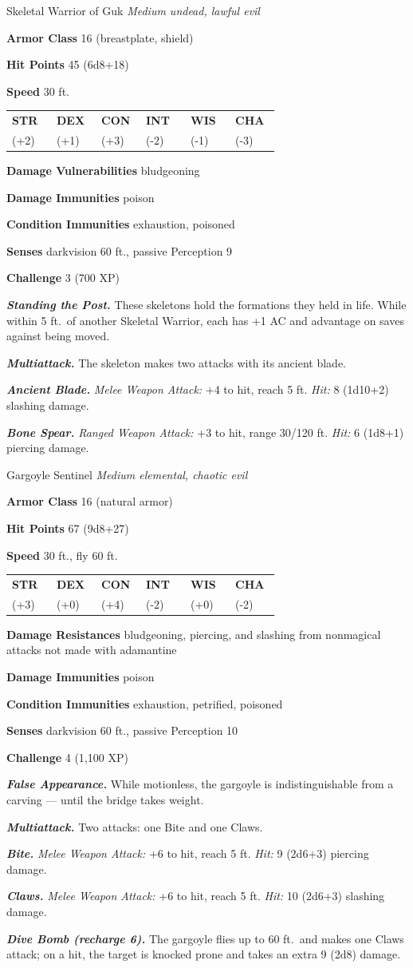 \documentclass[10pt,twoside]{report}
\makeatletter
\newcommand{\msub}[1]{{\itshape #1}\par}
\newcommand{\mrule}{\par\vspace{2pt}{\color{gukred}\rule{\linewidth}{1.1pt}}\par\vspace{2pt}}
\newcommand{\mthin}{\par\vspace{1pt}{\color{gukred!60}\rule{\linewidth}{0.5pt}}\par\vspace{2pt}}
\newcommand{\mfield}[2]{\noindent\textbf{\color{gukred}#1} #2\par}
\newcommand{\mhead}[1]{\par\smallskip{\sffamily\bfseries\scshape\color{gukred}#1}\par
  \vspace{-3pt}{\color{gukred}\rule{\linewidth}{0.7pt}}\par\vspace{2pt}}
\newcommand{\mtrait}[2]{\noindent\textbf{\itshape #1} #2\par\vspace{2pt}}
\newcommand{\abilities}[6]{\par\smallskip\noindent
  {\setlength{\tabcolsep}{1.5pt}%
  \begin{tabular}{@{}*{6}{p{0.15\linewidth}}@{}}
  \centering\sffamily\bfseries\color{gukred}STR &\centering\sffamily\bfseries\color{gukred}DEX
  &\centering\sffamily\bfseries\color{gukred}CON &\centering\sffamily\bfseries\color{gukred}INT
  &\centering\sffamily\bfseries\color{gukred}WIS &\centering\arraybackslash\sffamily\bfseries\color{gukred}CHA\\
  \centering #1 &\centering #2 &\centering #3 &\centering #4 &\centering #5 &\centering\arraybackslash #6\\
  \end{tabular}}\par\smallskip}
\makeatother
\begin{document}
\begin{statblock}{Skeletal Warrior of Guk}
\msub{Medium undead, lawful evil}
\mrule
\mfield{Armor Class}{16 (breastplate, shield)}
\mfield{Hit Points}{45 (6d8+18)}
\mfield{Speed}{30 ft.}
\abilities{15 (+2)}{13 (+1)}{16 (+3)}{6 (-2)}{8 (-1)}{5 (-3)}
\mthin
\mfield{Damage Vulnerabilities}{bludgeoning}
\mfield{Damage Immunities}{poison}
\mfield{Condition Immunities}{exhaustion, poisoned}
\mfield{Senses}{darkvision 60 ft., passive Perception 9}
\mfield{Challenge}{3 (700 XP)}
\mrule
\mtrait{Standing the Post.}{These skeletons hold the formations they held in life. While within 5 ft.\ of another Skeletal Warrior, each has +1 AC and advantage on saves against being moved.}
\mhead{Actions}
\mtrait{Multiattack.}{The skeleton makes two attacks with its ancient blade.}
\mtrait{Ancient Blade.}{\textit{Melee Weapon Attack:} +4 to hit, reach 5 ft. \textit{Hit:} 8 (1d10+2) slashing damage.}
\mtrait{Bone Spear.}{\textit{Ranged Weapon Attack:} +3 to hit, range 30/120 ft. \textit{Hit:} 6 (1d8+1) piercing damage.}
\end{statblock}

\begin{statblock}{Gargoyle Sentinel}
\msub{Medium elemental, chaotic evil}
\mrule
\mfield{Armor Class}{16 (natural armor)}
\mfield{Hit Points}{67 (9d8+27)}
\mfield{Speed}{30 ft., fly 60 ft.}
\abilities{17 (+3)}{11 (+0)}{18 (+4)}{6 (-2)}{11 (+0)}{7 (-2)}
\mthin
\mfield{Damage Resistances}{bludgeoning, piercing, and slashing from nonmagical attacks not made with adamantine}
\mfield{Damage Immunities}{poison}
\mfield{Condition Immunities}{exhaustion, petrified, poisoned}
\mfield{Senses}{darkvision 60 ft., passive Perception 10}
\mfield{Challenge}{4 (1{,}100 XP)}
\mrule
\mtrait{False Appearance.}{While motionless, the gargoyle is indistinguishable from a carving --- until the bridge takes weight.}
\mhead{Actions}
\mtrait{Multiattack.}{Two attacks: one Bite and one Claws.}
\mtrait{Bite.}{\textit{Melee Weapon Attack:} +6 to hit, reach 5 ft. \textit{Hit:} 9 (2d6+3) piercing damage.}
\mtrait{Claws.}{\textit{Melee Weapon Attack:} +6 to hit, reach 5 ft. \textit{Hit:} 10 (2d6+3) slashing damage.}
\mtrait{Dive Bomb (recharge 6).}{The gargoyle flies up to 60 ft.\ and makes one Claws attack; on a hit, the target is knocked prone and takes an extra 9 (2d8) damage.}
\end{statblock}
\end{document}
